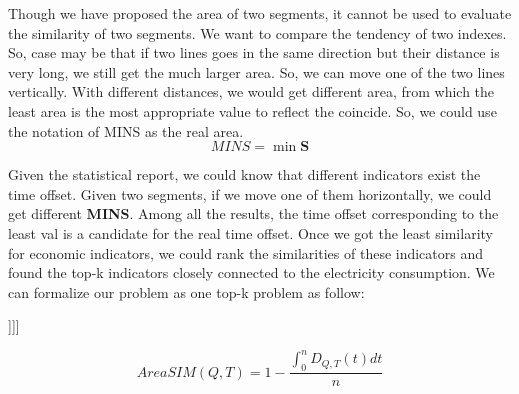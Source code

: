 Though we have proposed the area of two segments, it cannot be used to evaluate the similarity of two segments. We want to compare the tendency of two indexes. So, case may be that if two lines goes in the same direction but their distance is very long, we still get the much larger area. So, we can move one of the two lines vertically. With different distances, we would get different area, from which the least area is the most appropriate value to reflect the coincide. So, we could use the notation of MINS as the real area.
\begin{equation}
	MINS = \min{\textbf{S}}	
\end{equation}

Given the statistical report, we could know that different indicators exist the time offset. Given two segments, if we move one of them horizontally, we could get different \textbf{MINS}. Among all the results, the time offset corresponding to the least val is a candidate for the real time offset. Once we got the least similarity for economic indicators, we could rank the similarities of these indicators and found the top-k indicators closely connected to the electricity consumption. We can formalize our problem as one top-k problem as follow:
\begin{definition}
	[[[This part, we can put the top-K problem]]]]
\end{definition} 

\begin{equation}
AreaSIM(Q, T) = 1 - \frac{\int_{0}^{n}D_{Q,T}(t)dt}{n}	
\end{equation}
